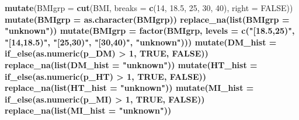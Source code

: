 \documentclass[]{article}
\newenvironment{Shaded}{\begin{snugshade}}{\end{snugshade}}
\newcommand{\CommentTok}[1]{\textcolor[rgb]{0.56,0.35,0.01}{\textit{#1}}}
\newcommand{\DataTypeTok}[1]{\textcolor[rgb]{0.13,0.29,0.53}{#1}}
\newcommand{\DecValTok}[1]{\textcolor[rgb]{0.00,0.00,0.81}{#1}}
\newcommand{\FloatTok}[1]{\textcolor[rgb]{0.00,0.00,0.81}{#1}}
\newcommand{\KeywordTok}[1]{\textcolor[rgb]{0.13,0.29,0.53}{\textbf{#1}}}
\newcommand{\NormalTok}[1]{#1}
\newcommand{\OperatorTok}[1]{\textcolor[rgb]{0.81,0.36,0.00}{\textbf{#1}}}
\newcommand{\OtherTok}[1]{\textcolor[rgb]{0.56,0.35,0.01}{#1}}
\newcommand{\StringTok}[1]{\textcolor[rgb]{0.31,0.60,0.02}{#1}}
\begin{document}
\begin{Shaded}
\begin{Highlighting}[]
{{{{{{{{\StringTok{  }\KeywordTok{mutate}\NormalTok{(}\DataTypeTok{BMIgrp =} \KeywordTok{cut}\NormalTok{(BMI, }\DataTypeTok{breaks =} \KeywordTok{c}\NormalTok{(}\DecValTok{14}\NormalTok{, }\FloatTok{18.5}\NormalTok{, }\DecValTok{25}\NormalTok{, }\DecValTok{30}\NormalTok{, }\DecValTok{40}\NormalTok{), }\DataTypeTok{right =} \OtherTok{FALSE}\NormalTok{)) }\OperatorTok{%
\StringTok{  }\KeywordTok{mutate}\NormalTok{(}\DataTypeTok{BMIgrp =} \KeywordTok{as.character}\NormalTok{(BMIgrp)) }\OperatorTok{%
\StringTok{  }\KeywordTok{replace_na}\NormalTok{(}\KeywordTok{list}\NormalTok{(}\DataTypeTok{BMIgrp =} \StringTok{"unknown"}\NormalTok{)) }\OperatorTok{%
\StringTok{  }\KeywordTok{mutate}\NormalTok{(}\DataTypeTok{BMIgrp =} \KeywordTok{factor}\NormalTok{(BMIgrp, }\DataTypeTok{levels =} \KeywordTok{c}\NormalTok{(}\StringTok{"[18.5,25)"}\NormalTok{,}
                                            \StringTok{"[14,18.5)"}\NormalTok{,}
                                            \StringTok{"[25,30)"}\NormalTok{, }
                                            \StringTok{"[30,40)"}\NormalTok{, }\StringTok{"unknown"}\NormalTok{))) }\OperatorTok{%
\StringTok{  }\KeywordTok{mutate}\NormalTok{(}\DataTypeTok{DM_hist =} \KeywordTok{if_else}\NormalTok{(}\KeywordTok{as.numeric}\NormalTok{(p_DM) }\OperatorTok{>}\StringTok{ }\DecValTok{1}\NormalTok{, }\OtherTok{TRUE}\NormalTok{, }\OtherTok{FALSE}\NormalTok{)) }\OperatorTok{%
\StringTok{  }\KeywordTok{replace_na}\NormalTok{(}\KeywordTok{list}\NormalTok{(}\DataTypeTok{DM_hist =} \StringTok{"unknown"}\NormalTok{)) }\OperatorTok{%
\StringTok{  }\KeywordTok{mutate}\NormalTok{(}\DataTypeTok{HT_hist =} \KeywordTok{if_else}\NormalTok{(}\KeywordTok{as.numeric}\NormalTok{(p_HT) }\OperatorTok{>}\StringTok{ }\DecValTok{1}\NormalTok{, }\OtherTok{TRUE}\NormalTok{, }\OtherTok{FALSE}\NormalTok{)) }\OperatorTok{%
\StringTok{  }\KeywordTok{replace_na}\NormalTok{(}\KeywordTok{list}\NormalTok{(}\DataTypeTok{HT_hist =} \StringTok{"unknown"}\NormalTok{)) }\OperatorTok{%
\StringTok{  }\KeywordTok{mutate}\NormalTok{(}\DataTypeTok{MI_hist =} \KeywordTok{if_else}\NormalTok{(}\KeywordTok{as.numeric}\NormalTok{(p_MI) }\OperatorTok{>}\StringTok{ }\DecValTok{1}\NormalTok{, }\OtherTok{TRUE}\NormalTok{, }\OtherTok{FALSE}\NormalTok{)) }\OperatorTok{%
\StringTok{  }\KeywordTok{replace_na}\NormalTok{(}\KeywordTok{list}\NormalTok{(}\DataTypeTok{MI_hist =} \StringTok{"unknown"}\NormalTok{)) }\OperatorTok{%
}}}}}}}}}}}}}}}}}}
\end{Highlighting}
\end{Shaded}
\end{document}
